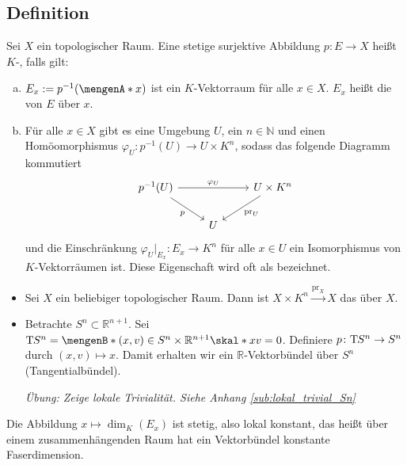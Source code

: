 \subsection[Definition: $K$-Vektorbündel]{Definition} %
\label{sub:21}
Sei $X$ ein topologischer Raum. Eine stetige surjektive Abbildung $p \colon E \to X$ heißt $K$-, falls gilt: 
\begin{enumerate}[a)]
	\item $ E_x := p^{-1}(\set{x})$ ist ein $K$-Vektorraum für alle $x \in X$. $E_x$ heißt die  von $E$ über $x$. 
	\item Für alle $x \in X$ gibt es eine Umgebung $U$, ein $n \in \mathds{N}$ und einen Homöomorphismus $\varphi_U \colon p^{-1}(U) \to U \times K^n$, sodass das folgende 
	Diagramm kommutiert
	\[
		\begin{tikzcd}
			p^{-1}(U) \arrow["\varphi_U"]{rr} \drar["p"'] & & U \times K^n  \dlar["\mathrm{pr}_U"] \\
			& U 
		\end{tikzcd}
	\]
	und die Einschränkung $\varphi_U \big|_{E_x} \colon E_x \to K^n$ für alle $x \in U$ ein Isomorphismus von $K$-Vektorräumen ist. Diese Eigenschaft wird oft als 
	 bezeichnet.
\end{enumerate}
\begin{itemize}
	\item Sei $X$ ein beliebiger topologischer Raum. Dann ist $X \times K^n \xrightarrow{\mathrm{pr}_X} X$ das  über $X$.
	\item Betrachte $S^n \subset \mathds{R}^{n+1}$. Sei $\Tmap S^n = \set[(x,v) \in S^n \times \mathds{R}^{n+1}]{\skal*{x}{v}=0}$. Definiere $p \colon \mathrm{T}\mkern-0.85mu S^n \to S^n$ 
	durch $(x,v) \mapsto x$. Damit erhalten wir ein $\mathds{R}$-Vektorbündel über $S^n$ (Tangentialbündel). 
	
	\emph{Übung: Zeige lokale Trivialität. Siehe Anhang \ref{sub:lokal_trivial_Sn}}
\end{itemize}
Die Abbildung $x \mapsto \dim_K (E_x)$ ist stetig, also lokal konstant, das heißt über einem zusammenhängenden Raum hat ein Vektorbündel konstante Faserdimension. 

